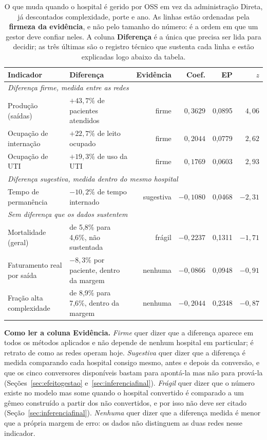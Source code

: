\begin{table}[H]
\centering
\caption{O que muda quando o hospital é gerido por OSS em vez da
administração Direta, já descontados complexidade, porte e ano. As linhas
estão ordenadas pela \textbf{firmeza da evidência}, e não pelo tamanho do
número: é a ordem em que um gestor deve confiar neles. A coluna
\textbf{Diferença} é a única que precisa ser lida para decidir; as três
últimas são o registro técnico que sustenta cada linha e estão explicadas
logo abaixo da tabela.}
\label{tab:contrasteoss}
\small
\setlength{\tabcolsep}{4.5pt}
\begin{tabular}{llrrrr}
\toprule
Indicador & Diferença & Evidência & Coef. & EP & $z$ \\
\midrule
\multicolumn{6}{l}{\emph{Diferença firme, medida entre as redes}}\\
Produção (saídas)            & $+43{,}7\%$ de pacientes atendidos & firme & $0{,}3629$ & 0,0895 & $4{,}06$ \\
Ocupação de internação       & $+22{,}7\%$ de leito ocupado & firme & $0{,}2044$ & 0,0779 & $2{,}62$ \\
Ocupação de UTI              & $+19{,}3\%$ de uso da UTI & firme & $0{,}1769$ & 0,0603 & $2{,}93$ \\
\midrule
\multicolumn{6}{l}{\emph{Diferença sugestiva, medida dentro do mesmo hospital}}\\
Tempo de permanência         & $-10{,}2\%$ de tempo internado & sugestiva & $-0{,}1080$ & 0,0468 & $-2{,}31$ \\
\midrule
\multicolumn{6}{l}{\emph{Sem diferença que os dados sustentem}}\\
Mortalidade (geral)          & de 5,8\% para 4,6\%, não sustentada & frágil & $-0{,}2237$ & 0,1311 & $-1{,}71$ \\
Faturamento real por saída   & $-8{,}3\%$ por paciente, dentro da margem & nenhuma & $-0{,}0866$ & 0,0948 & $-0{,}91$ \\
Fração alta complexidade     & de 8,9\% para 7,6\%, dentro da margem & nenhuma & $-0{,}2044$ & 0,2348 & $-0{,}87$ \\
\bottomrule
\end{tabular}
\end{table}

\noindent\textbf{Como ler a coluna Evidência.} \emph{Firme} quer dizer que
a diferença aparece em todos os métodos aplicados e não depende de nenhum
hospital em particular; é retrato de como as redes operam hoje.
\emph{Sugestiva} quer dizer que a diferença é medida comparando cada
hospital consigo mesmo, antes e depois da conversão, e que os cinco
conversores disponíveis bastam para apontá-la mas não para prová-la
(Seções~\ref{sec:efeitogestao} e~\ref{sec:inferenciafinal}).
\emph{Frágil} quer dizer que o número existe no modelo mas some quando o
hospital convertido é comparado a um gêmeo construído a partir dos não
convertidos, e por isso não deve ser citado
(Seção~\ref{sec:inferenciafinal}). \emph{Nenhuma} quer dizer que a
diferença medida é menor que a própria margem de erro: os dados não
distinguem as duas redes nesse indicador.

